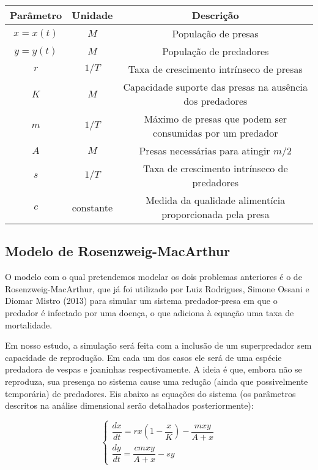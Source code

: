 \begin{center}
\begin{tabular}{| c | c | c |}
\hline
Parâmetro & Unidade & Descrição\\
\hline
$x=x(t)$ & $M$ & População de presas\\
$y=y(t)$ & $M$ & População de predadores\\
$r$ & $1/T$ & Taxa de crescimento intrínseco de presas\\
$K$ & $M$ & Capacidade suporte das presas na ausência dos predadores\\
$m$ & $1/T$ & Máximo de presas que podem ser consumidas por um predador\\
$A$ & $M$ & Presas necessárias para atingir $m/2$\\
$s$ & $1/T$ & Taxa de crescimento intrínseco de predadores\\
$c$ & constante & Medida da qualidade alimentícia proporcionada pela presa\\
\hline
\end{tabular}
\end{center}

\newpage

\subsection{Modelo de Rosenzweig-MacArthur}

O modelo com o qual pretendemos modelar os dois problemas anteriores é o de Rosenzweig-MacArthur, que já foi utilizado por Luiz Rodrigues, Simone Ossani e Diomar Mistro (2013) \cite{lr_so_dm_2013} para simular um sistema predador-presa em que o predador é infectado por uma doença, o que adiciona à equação uma taxa de mortalidade. 

Em nosso estudo, a simulação será feita com a inclusão de um superpredador sem capacidade de reprodução. Em cada um dos casos ele será de uma espécie predadora de vespas e joaninhas respectivamente. A ideia é que, embora não se reproduza, sua presença no sistema cause uma redução (ainda que possivelmente temporária) de predadores. Eis abaixo as equações do sistema (os parâmetros descritos na análise dimensional serão detalhados posteriormente):

$$\left\{
\begin{array}{l}
\dfrac{dx}{dt}=rx\left(1-\dfrac{x}{K}\right)-\dfrac{mxy}{A+x}\\
\dfrac{dy}{dt}=\dfrac{cmxy}{A+x}-sy
\end{array}
\right.$$

